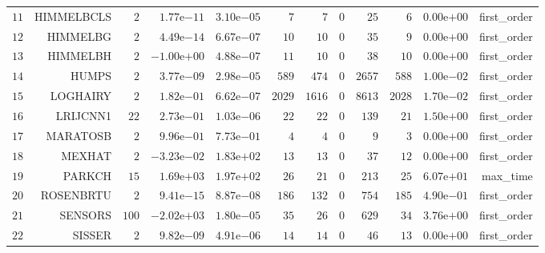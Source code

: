 \begin{longtable}{rrrrrrrrrrrr}
  \(    11\) & HIMMELBCLS & \(     2\) & \( 1.77\)e\(-11\) & \( 3.10\)e\(-05\) & \(     7\) & \(     7\) & \(     0\) & \(    25\) & \(     6\) & \( 0.00\)e\(+00\) & first\_order \\
  \(    12\) & HIMMELBG & \(     2\) & \( 4.49\)e\(-14\) & \( 6.67\)e\(-07\) & \(    10\) & \(    10\) & \(     0\) & \(    35\) & \(     9\) & \( 0.00\)e\(+00\) & first\_order \\
  \(    13\) & HIMMELBH & \(     2\) & \(-1.00\)e\(+00\) & \( 4.88\)e\(-07\) & \(    11\) & \(    10\) & \(     0\) & \(    38\) & \(    10\) & \( 0.00\)e\(+00\) & first\_order \\
  \(    14\) & HUMPS & \(     2\) & \( 3.77\)e\(-09\) & \( 2.98\)e\(-05\) & \(   589\) & \(   474\) & \(     0\) & \(  2657\) & \(   588\) & \( 1.00\)e\(-02\) & first\_order \\
  \(    15\) & LOGHAIRY & \(     2\) & \( 1.82\)e\(-01\) & \( 6.62\)e\(-07\) & \(  2029\) & \(  1616\) & \(     0\) & \(  8613\) & \(  2028\) & \( 1.70\)e\(-02\) & first\_order \\
  \(    16\) & LRIJCNN1 & \(    22\) & \( 2.73\)e\(-01\) & \( 1.03\)e\(-06\) & \(    22\) & \(    22\) & \(     0\) & \(   139\) & \(    21\) & \( 1.50\)e\(+00\) & first\_order \\
  \(    17\) & MARATOSB & \(     2\) & \( 9.96\)e\(-01\) & \( 7.73\)e\(-01\) & \(     4\) & \(     4\) & \(     0\) & \(     9\) & \(     3\) & \( 0.00\)e\(+00\) & first\_order \\
  \(    18\) & MEXHAT & \(     2\) & \(-3.23\)e\(-02\) & \( 1.83\)e\(+02\) & \(    13\) & \(    13\) & \(     0\) & \(    37\) & \(    12\) & \( 0.00\)e\(+00\) & first\_order \\
  \(    19\) & PARKCH & \(    15\) & \( 1.69\)e\(+03\) & \( 1.97\)e\(+02\) & \(    26\) & \(    21\) & \(     0\) & \(   213\) & \(    25\) & \( 6.07\)e\(+01\) & max\_time \\
  \(    20\) & ROSENBRTU & \(     2\) & \( 9.41\)e\(-15\) & \( 8.87\)e\(-08\) & \(   186\) & \(   132\) & \(     0\) & \(   754\) & \(   185\) & \( 4.90\)e\(-01\) & first\_order \\
  \(    21\) & SENSORS & \(   100\) & \(-2.02\)e\(+03\) & \( 1.80\)e\(-05\) & \(    35\) & \(    26\) & \(     0\) & \(   629\) & \(    34\) & \( 3.76\)e\(+00\) & first\_order \\
  \(    22\) & SISSER & \(     2\) & \( 9.82\)e\(-09\) & \( 4.91\)e\(-06\) & \(    14\) & \(    14\) & \(     0\) & \(    46\) & \(    13\) & \( 0.00\)e\(+00\) & first\_order \\

\end{longtable}
